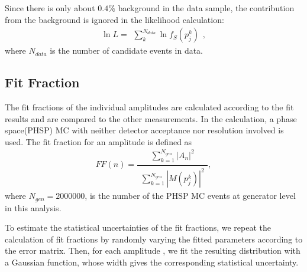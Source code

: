 {    Since there is only about $0.4\%$ background in the data sample, the contribution from the background is ignored in the likelihood calculation:
    \begin{equation}
    \ln L = \begin{matrix}\sum_{k}^{N_{data}} \ln f_{S}(p_{j}^{k})\end{matrix},  \label{likelihood}
    \end{equation}
    where $N_{data}$ is the number of candidate events in data.
}


\subsection{Fit Fraction}
\par{
The fit fractions of the individual amplitudes are calculated according to the fit results and are compared to the other measurements. In the calculation, a phase space(PHSP) MC with neither detector acceptance nor resolution involved is used. The fit fraction for an amplitude is defined as
    \begin{equation}
    FF(n) = \frac{\begin{matrix}\sum_{k=1}^{N_{gen}} \left|A_{n}\right|^{2}\end{matrix}}{\begin{matrix}\sum_{k=1}^{N_{gen}} \left|M(p_{j}^{k})\right|^{2}\end{matrix}}, \label{Fit-Fraction-Definition}
    \end{equation}
    where $N_{gen} = 2000000$, is the number of the PHSP MC events at generator level in this analysis. 

    To estimate the statistical uncertainties of the fit fractions, we repeat the calculation of fit fractions by randomly varying the fitted parameters according to the error matrix. 
    Then, for each amplitude , we fit the resulting distribution with a Gaussian function, whose width gives the corresponding statistical uncertainty.
}

